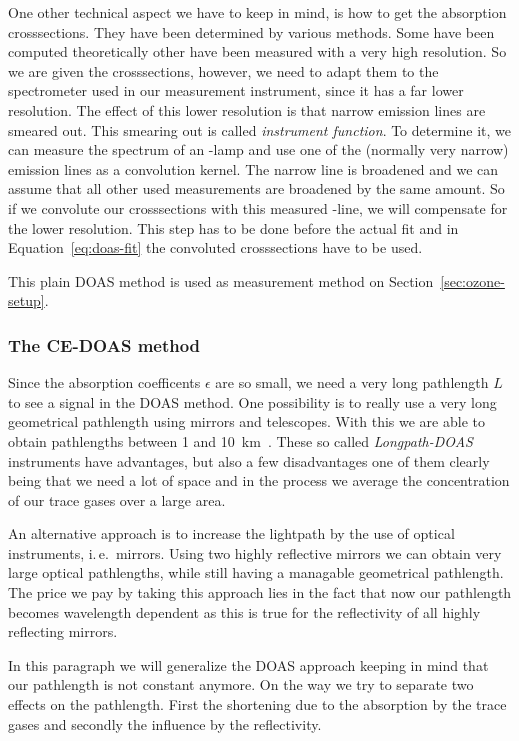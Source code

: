 One other technical aspect we have to keep in mind, is how to get the
absorption crosssections. They have been determined by various
methods. Some have been computed theoretically other have been
measured with a very high resolution. So we are given the
crosssections, however, we need to adapt them to the spectrometer used
in our measurement instrument, since it has a far lower
resolution. The effect of this lower resolution is that narrow
emission lines are smeared out. This smearing out is called
\emph{instrument function}. To determine it, we can measure the
spectrum of an -lamp and use one of the
(normally very narrow) emission lines as a convolution kernel. The
narrow line is broadened and we can assume that all other used
measurements are broadened by the same amount. So if we convolute our
crosssections with this measured -line, we will compensate for
the lower resolution. This step has to be done before the actual fit
and in Equation~\eqref{eq:doas-fit} the convoluted crosssections have
to be used.

This plain DOAS method is used as measurement method on
Section~\ref{sec:ozone-setup}. 

\subsubsection{The CE-DOAS method}
\label{sec:ce-doas}

Since the absorption coefficents $\epsilon$ are so small, we need a
very long pathlength $L$ to see a signal in the DOAS method. One
possibility is to really use a very long geometrical pathlength using
mirrors and telescopes. With this we are able to obtain pathlengths
between \num{1} and \SI{10}{\kilo\meter}~\cite{platt}. These so called
\emph{Longpath-DOAS} instruments have advantages, but also a few
disadvantages one of them clearly being that we need a lot of space
and in the process we average the concentration of our trace gases
over a large area.

An alternative approach is to increase the lightpath by the use of
optical instruments, i.\,e.\ mirrors. Using two highly reflective
mirrors we can obtain very large optical pathlengths, while still
having a managable geometrical pathlength. The price we pay by taking
this approach lies in the fact that now our pathlength becomes
wavelength dependent as this is true for the reflectivity of all
highly reflecting mirrors. 

In this paragraph we will generalize the DOAS approach keeping in mind
that our pathlength is not constant anymore. On the way we try to
separate two effects on the pathlength. First the shortening due to
the absorption by the trace gases and secondly the influence by the
reflectivity.

